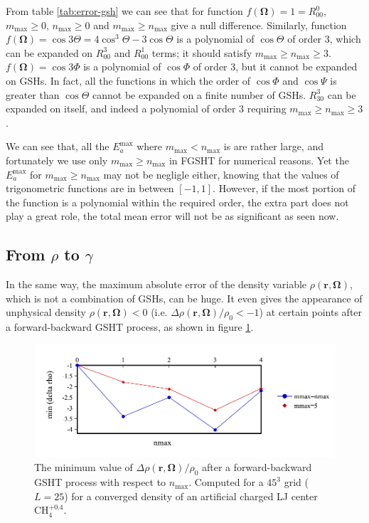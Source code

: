 From table \ref{tab:error-gsh} we can see that for function $f(\mathbf{\Omega})=1=R_{00}^{0}$,
$m_{\max}\geq0$, $n_{\max}\geq0$ and $m_{\max}\geq n_{\max}$ give
a null difference. Similarly, function $f(\mathbf{\Omega})=\cos3\Theta=4\cos^{3}\Theta-3\cos\Theta$
is a polynomial of $\cos\Theta$ of order 3, which can be expanded
on $R_{00}^{3}$ and $R_{00}^{1}$ terms; it should satisfy $m_{\max}\geq n_{\max}\geq3$.
$f(\mathbf{\Omega})=\cos3\Phi$ is a polynomial of $\cos\Phi$ of
order 3, but it cannot be expanded on \acs{GSH}s. In fact, all the
functions in which the order of $\cos\Phi$ and $\cos\Psi$ is greater
than $\cos\Theta$ cannot be expanded on a finite number of \acs{GSH}s.
$R_{30}^{3}$ can be expanded on itself, and indeed a polynomial of
order 3 requiring $m_{\max}\geq n_{\max}\geq3$.

We can see that, all the $E_{a}^{\mathrm{max}}$ where $m_{\max}<n_{\max}$
is are rather large, and fortunately we use only $m_{\max}\geq n_{\max}$
in \acs{FGSHT} for numerical reasons. Yet the $E_{a}^{\mathrm{max}}$
for $m_{\max}\geq n_{\max}$ may not be negligle either, knowing that
the values of trigonometric functions are in between $\left[-1,1\right]$.
However, if the most portion of the function is a polynomial within
the required order, the extra part does not play a great role, the
total mean error will not be as significant as seen now. 

\subsection{From $\rho$ to $\gamma$}

In the same way, the maximum absolute error of the density variable
$\rho(\mathbf{r},\mathbf{\Omega})$, which is not a combination of
\acs{GSH}s, can be huge. It even gives the appearance of unphysical
density $\rho(\mathbf{r},\mathbf{\Omega})<0$ (i.e. $\Delta\rho(\mathbf{r},\mathbf{\Omega})/\rho_{0}<-1$)
at certain points after a forward-backward \acs{GSHT} process, as
shown in figure \ref{fig:unphysical-rho}.

\begin{figure}[h]
\begin{centering}
\includegraphics[bb=0bp 20bp 454bp 150bp,width=0.75\columnwidth]{_figure/results/min_delta_rho}
\par\end{centering}
\caption[The minimum value of $\Delta\rho(\mathbf{r},\mathbf{\Omega})/\rho_{0}$
after a forward-backward \acs{GSHT} process]{The minimum value of $\Delta\rho(\mathbf{r},\mathbf{\Omega})/\rho_{0}$
after a forward-backward \acs{GSHT} process with respect to $n_{\max}$.
Computed for a $45^{3}$ grid ($L=25$) for a converged density of
an artificial charged LJ center $\mathrm{CH}_{4}^{+0.4}$. \label{fig:unphysical-rho} }
\end{figure}

